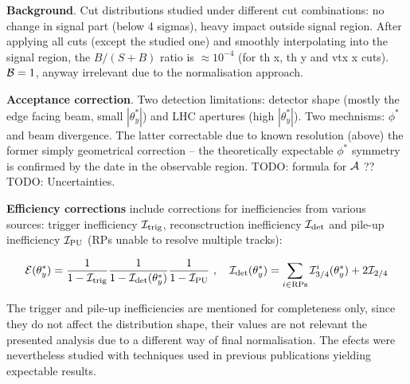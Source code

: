 \documentclass[TOTEM]{cern/cernphprep}
\begin{document}
{\bf Background}. Cut distributions studied under different cut combinations: no change in signal part (below 4 sigmas), heavy impact outside signal region. After applying all cuts (except the studied one) and smoothly interpolating into the signal region, the $B/(S+B)$ ratio is $\approx 10^{-4}$ (for th x, th y and vtx x cuts). ${\cal B} = 1$, anyway irrelevant due to the normalisation approach.

{\bf Acceptance correction}. Two detection limitations: detector shape (mostly the edge facing beam, small $|\theta_y^*|$) and LHC apertures (high $|\theta_y^*|$). Two mechnisms: $\phi^*$ and beam divergence. The latter correctable due to known resolution (above) the former simply geometrical correction -- the theoretically expectable $\phi^*$ symmetry is confirmed by the date in the observable region. TODO: formula for ${\cal A}$ ?? TODO: Uncertainties.

{\bf Efficiency corrections} include corrections for inefficiencies from various sources: trigger inefficiency ${\cal I}_{\rm trig}$, reconsctruction inefficiency ${\cal I}_{\rm det}$ and pile-up inefficiency ${\cal I}_{\rm PU}$ (RPs unable to resolve multiple tracks):

\begin{equation}
\label{efficiency}
{\cal E}(\theta_y^*) = {1\over 1 - {\cal I}_{\rm trig}} {1\over 1 - {\cal I}_{\rm det}(\theta_y^*)} {1\over 1 - {\cal I}_{\rm PU}}\ ,\quad
{\cal I}_{\rm det}(\theta_y^*) = \sum\limits_{i\in \rm RPs} {\cal I}^i_{3/4}(\theta_y^*) + 2 {\cal I}_{2/4}
\end{equation}

The trigger and pile-up inefficiencies are mentioned for completeness only, since they do not affect the distribution shape, their values are not relevant the presented analysis due to a different way of final normalisation. The efects were nevertheless studied with techniques used in previous publications yielding expectable results.
\end{document}
